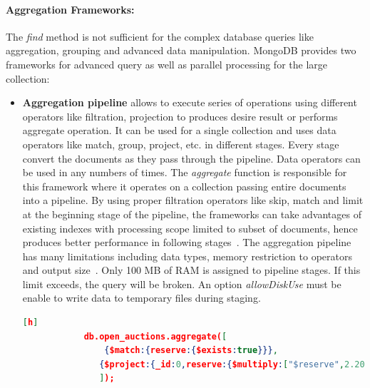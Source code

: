 \paragraph{Aggregation Frameworks:}
 The \textit{find} method is not sufficient for the complex database queries like aggregation, grouping  and advanced data manipulation. MongoDB provides two frameworks for advanced query as well as parallel processing for the large collection:
 \begin{itemize}
		\item{ \textbf{Aggregation pipeline}} allows to execute series of operations using different operators like filtration, projection to produces desire result or performs aggregate operation.  It can be used for a single collection and uses  data operators like match, group, project, etc. in different stages. Every stage convert the documents as they pass through the pipeline. Data operators can be used  in any numbers of times.  The \textit{aggregate} function is responsible for this framework where it operates on a collection passing  entire documents into a pipeline. By using proper filtration operators like  skip, match and limit at the beginning  stage of the pipeline,  the frameworks can take advantages of existing indexes with processing scope limited to subset of documents, hence produces better performance in following stages~\cite{mongodbaggregation}. The aggregation pipeline has many limitations including data types, memory restriction to operators and output size~\cite{nosql/comparision}. Only 100 MB of RAM is assigned to pipeline stages. If this limit exceeds, the query will be broken. An option \textit{allowDiskUse} must be enable to write data to temporary files during staging.
		
				   \begin{lstlisting}[language=JSON,caption=An example Aggregation pipeline in MongoDB, label=mongodb-aggregation-pipeline, basicstyle = \scriptsize][h]
            db.open_auctions.aggregate([
                {$match:{reserve:{$exists:true}}},
		       {$project:{_id:0,reserve:{$multiply:["$reserve",2.20371]}}}
		       ]);
		  \end{lstlisting}
		  

\end{itemize}
